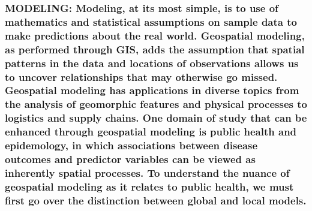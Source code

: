 \documentclass[
  12pt,
]{article}
\begin{document}
\hypertarget{modeling-modeling-at-its-most-simple-is-to-use-of-mathematics-and-statistical-assumptions-on-sample-data-to-make-predictions-about-the-real-world.-geospatial-modeling-as-performed-through-gis-adds-the-assumption-that-spatial-patterns-in-the-data-and-locations-of-observations-allows-us-to-uncover-relationships-that-may-otherwise-go-missed.-geospatial-modeling-has-applications-in-diverse-topics-from-the-analysis-of-geomorphic-features-and-physical-processes-to-logistics-and-supply-chains.-one-domain-of-study-that-can-be-enhanced-through-geospatial-modeling-is-public-health-and-epidemology-in-which-associations-between-disease-outcomes-and-predictor-variables-can-be-viewed-as-inherently-spatial-processes.-to-understand-the-nuance-of-geospatial-modeling-as-it-relates-to-public-health-we-must-first-go-over-the-distinction-between-global-and-local-models.}{%
\subsubsection{MODELING: Modeling, at its most simple, is to use of
mathematics and statistical assumptions on sample data to make
predictions about the real world. Geospatial modeling, as performed
through GIS, adds the assumption that spatial patterns in the data and
locations of observations allows us to uncover relationships that may
otherwise go missed. Geospatial modeling has applications in diverse
topics from the analysis of geomorphic features and physical processes
to logistics and supply chains. One domain of study that can be enhanced
through geospatial modeling is public health and epidemology, in which
associations between disease outcomes and predictor variables can be
viewed as inherently spatial processes. To understand the nuance of
geospatial modeling as it relates to public health, we must first go
over the distinction between global and local
models.}\label{modeling-modeling-at-its-most-simple-is-to-use-of-mathematics-and-statistical-assumptions-on-sample-data-to-make-predictions-about-the-real-world.-geospatial-modeling-as-performed-through-gis-adds-the-assumption-that-spatial-patterns-in-the-data-and-locations-of-observations-allows-us-to-uncover-relationships-that-may-otherwise-go-missed.-geospatial-modeling-has-applications-in-diverse-topics-from-the-analysis-of-geomorphic-features-and-physical-processes-to-logistics-and-supply-chains.-one-domain-of-study-that-can-be-enhanced-through-geospatial-modeling-is-public-health-and-epidemology-in-which-associations-between-disease-outcomes-and-predictor-variables-can-be-viewed-as-inherently-spatial-processes.-to-understand-the-nuance-of-geospatial-modeling-as-it-relates-to-public-health-we-must-first-go-over-the-distinction-between-global-and-local-models.}}
\end{document}
